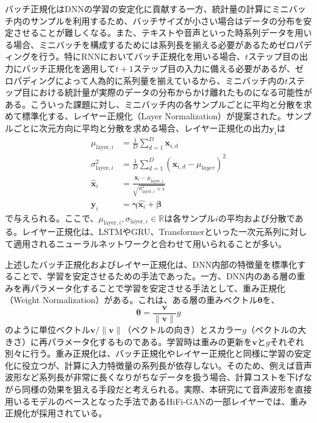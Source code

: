 \documentclass[12pt]{jarticle}
\numberwithin{equation}{section}    %
\numberwithin{figure}{section}      %
\numberwithin{table}{section}      %
\begin{document}
バッチ正規化はDNNの学習の安定化に貢献する一方、統計量の計算にミニバッチ内のサンプルを利用するため、バッチサイズが小さい場合はデータの分布を安定させることが難しくなる。また、テキストや音声といった時系列データを用いる場合、ミニバッチを構成するためには系列長を揃える必要があるためゼロパディングを行う。特にRNNにおいてバッチ正規化を用いる場合、$t$ステップ目の出力にバッチ正規化を適用して$t + 1$ステップ目の入力に備える必要があるが、ゼロパディングによって人為的に系列量を揃えているから、ミニバッチ内の$t$ステップ目における統計量が実際のデータの分布からかけ離れたものになる可能性がある。こういった課題に対し、ミニバッチ内の各サンプルごとに平均と分散を求めて標準化する、レイヤー正規化（Layer Normalization）\cite{ba2016layer}が提案された。サンプルごとに次元方向に平均と分散を求める場合、レイヤー正規化の出力$\bm{y}_{i}$は
\begin{align}
    \mu_{\text{layer}, i}        & = \frac{1}{D} \sum_{d = 1}^{D} \bm{x}_{i, d}                                                 \\
    \sigma_{\text{layer}, i}^{2} & = \frac{1}{D} \sum_{d = 1}^{D} (\bm{x}_{i, d} - \mu_{layer})^{2}                             \\
    \hat{\bm{x}}_{i}             & = \frac{\bm{x}_{i} - \mu_{\text{layer}, i}}{\sqrt{\sigma_{\text{layer}, i}^{2}  + \epsilon}} \\
    \bm{y}_{i}                   & = \bm{\gamma} \hat{\bm{x}_{i}} + \bm{\beta}
\end{align}
で与えられる。ここで、$\mu_{\text{layer}, i}, \sigma_{\text{layer}, i} \in \mathbb{R}$は各サンプル$i$の平均および分散である。レイヤー正規化は、LSTMやGRU、Transformerといった一次元系列に対して適用されるニューラルネットワークと合わせて用いられることが多い。

上述したバッチ正規化およびレイヤー正規化は、DNN内部の特徴量を標準化することで、学習を安定させるための手法であった。一方、DNN内のある層の重みを再パラメータ化することで学習を安定させる手法として、重み正規化（Weight Normalization）\cite{salimans2016weight}がある。これは、ある層の重みベクトル$\bm{\theta}$を、
\begin{equation}
    \bm{\theta} = \frac{\bm{v}}{\| \bm{v} \|} g
\end{equation}
のように単位ベクトル$\bm{v} / \| \bm{v} \|$（ベクトルの向き）とスカラー$g$（ベクトルの大きさ）に再パラメータ化するものである。学習時は重みの更新を$\bm{v}$と$g$それぞれ別々に行う。重み正規化は、バッチ正規化やレイヤー正規化と同様に学習の安定化に役立つが、計算に入力特徴量の系列長が依存しない。そのため、例えば音声波形など系列長が非常に長くなりがちなデータを扱う場合、計算コストを下げながら同様の効果を狙える手段だと考えられる。実際、本研究にて音声波形を直接用いるモデルのベースとなった手法であるHiFi-GAN\cite{kong2020hifi}の一部レイヤーでは、重み正規化が採用されている。
\end{document}
